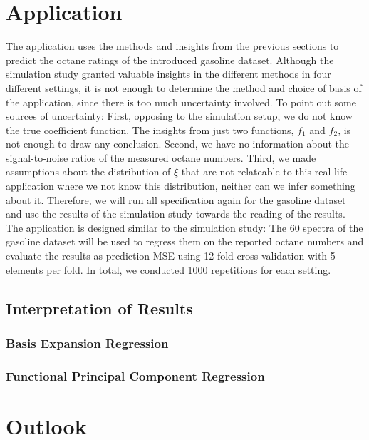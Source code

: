 \documentclass[11pt,twoside,a4paper]{article}
\begin{document}
	\section{Application}\label{Application}
		The application uses the methods and insights from the previous sections to predict the octane ratings of the introduced gasoline dataset.
		Although the simulation study granted valuable insights in the different methods in four different settings, it is not enough to determine the method and choice of basis of the application, since there is too much uncertainty involved. To point out some sources of uncertainty: First, opposing to the simulation setup, we do not know the true coefficient function. The insights from just two functions, $f_1$ and $f_2$, is not enough to draw any conclusion. Second, we have no information about the signal-to-noise ratios of the measured octane numbers. Third, we made assumptions about the distribution of $\xi$ that are not relateable to this real-life application where we not know this distribution, neither can we infer something about it. 
		Therefore, we will run all specification again for the gasoline dataset and use the results of the simulation study towards the reading of the results. The application is designed similar to the simulation study: The 60 spectra of the gasoline dataset will be used to regress them on the reported octane numbers and evaluate the results as prediction MSE using 12 fold cross-validation with 5 elements per fold. In total, we conducted 1000 repetitions for each setting.
		
	\subsection{Interpretation of Results}
		\subsubsection{Basis Expansion Regression}
		\subsubsection{Functional Principal Component Regression}
	
	
	
	

	\section{Outlook}\label{Outlook}
	
\end{document}
